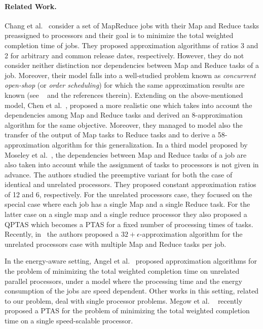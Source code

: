 \documentclass{llncs}
\begin{document}
\paragraph{Related Work.}
Chang et al.~\cite{ChangKKLLM11} consider a set of MapReduce jobs with their Map and Reduce tasks
preassigned to processors and their goal is to minimize the total weighted completion time of jobs.
They proposed approximation algorithms of ratios 3 and 2 for arbitrary and common release dates, respectively.
However, they do not consider neither distinction nor dependencies between Map and Reduce tasks of a job.
Moreover, their model  falls  into a well-studied problem known as  {\em concurrent open-shop}
(or {\em order scheduling}) for which the same approximation results are known  (see ~\cite{MastrolilliQSSU10} and the references therein).
Extending on the above-mentioned model, Chen et al.~\cite{ChenKL12},
proposed a more realistic one which takes into account the dependencies among Map and Reduce tasks  and derived  an 8-approximation algorithm for the same objective.
Moreover, they managed to model  also the  transfer of the output of Map tasks to Reduce tasks and to derive  a  58-approximation algorithm for this generalization.
In a third model proposed by Moseley et al.~\cite{MoseleyDKS11}, the dependencies between Map and Reduce tasks of a job are also  taken into account while the assignment of tasks to processors is not given in advance.
The authors studied the preemptive variant for both the case of identical and unrelated processors. They proposed constant approximation ratios of 12 and 6, respectively.
For the unrelated processors case, they focused on the special case where each job has a single Map and a single Reduce task.
For the latter case on a single map and a single reduce processor they also proposed a QPTAS which becomes a PTAS for a fixed number of processing times of tasks. Recently, in~\cite{FotakisMZZ13} the authors proposed a $32+\epsilon$-approximation algorithm for the unrelated processors case with multiple Map and Reduce tasks per job.

In the energy-aware setting, Angel et al.~\cite{AngelBK12}
proposed approximation algorithms for the problem of minimizing
the total weighted completion time on unrelated parallel
processors, under a model where the processing time and the energy
consumption of the jobs are speed dependent. Other works in this setting,
related to our problem, deal with single processor problems.
Megow et al. ~\cite{MegowV12} recently proposed a PTAS for the problem of minimizing the total weighted completion time on a single speed-scalable processor.
\end{document}
